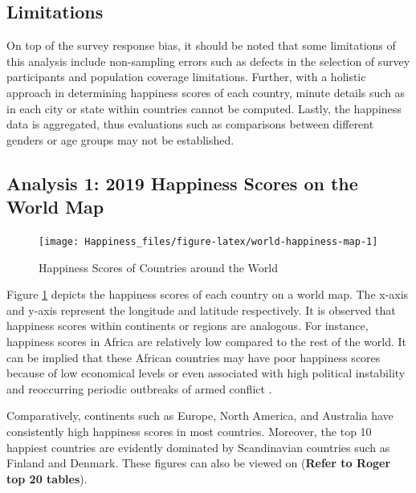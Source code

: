 \documentclass[11pt,a4paper,]{article}
\begin{document}
\clearpage

\hypertarget{limitations}{%
\subsection{Limitations}\label{limitations}}

On top of the survey response bias, it should be noted that some limitations of this analysis include non-sampling errors such as defects in the selection of survey participants and population coverage limitations. Further, with a holistic approach in determining happiness scores of each country, minute details such as in each city or state within countries cannot be computed. Lastly, the happiness data is aggregated, thus evaluations such as comparisons between different genders or age groups may not be established.

\clearpage

\hypertarget{analysis-1-2019-happiness-scores-on-the-world-map}{%
\subsection{Analysis 1: 2019 Happiness Scores on the World Map}\label{analysis-1-2019-happiness-scores-on-the-world-map}}

\begin{figure}

{\centering \texttt{[image: Happiness\_files/figure-latex/world-happiness-map-1]} 

}

\caption{Happiness Scores of Countries around the World}\label{fig:world-happiness-map}
\end{figure}

Figure \ref{fig:world-happiness-map} depicts the happiness scores of each country on a world map. The x-axis and y-axis represent the longitude and latitude respectively. It is observed that happiness scores within continents or regions are analogous. For instance, happiness scores in Africa are relatively low compared to the rest of the world. It can be implied that these African countries may have poor happiness scores because of low economical levels or even associated with high political instability and reoccurring periodic outbreaks of armed conflict \autocite{sachs2018world}.

Comparatively, continents such as Europe, North America, and Australia have consistently high happiness scores in most countries. Moreover, the top 10 happiest countries are evidently dominated by Scandinavian countries such as Finland and Denmark. These figures can also be viewed on (\textbf{Refer to Roger top 20 tables}).
\end{document}
